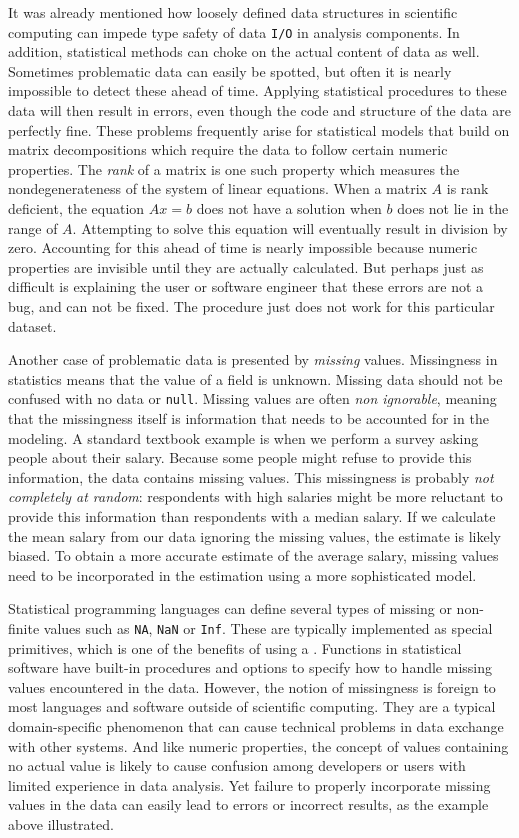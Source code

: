 It was already mentioned how loosely defined data structures in scientific computing can impede type safety of data \texttt{I/O} in analysis components. In addition, statistical methods can choke on the actual content of data as well. Sometimes problematic data can easily be spotted, but often it is nearly impossible to detect these ahead of time. Applying statistical procedures to these data will then result in errors, even though the code and structure of the data are perfectly fine. These problems frequently arise for statistical models that build on matrix decompositions which require the data to follow certain numeric properties. The \emph{rank} of a matrix is one such property which measures the nondegenerateness of the system of linear equations. When a matrix $A$ is rank deficient, the equation $Ax=b$ does not have a solution when $b$ does not lie in the range of $A$. Attempting to solve this equation will eventually result in division by zero. Accounting for this ahead of time is nearly impossible because numeric properties are invisible until they are actually calculated. But perhaps just as difficult is explaining the user or software engineer that these errors are not a bug, and can not be fixed. The procedure just does not work for this particular dataset.

Another case of problematic data is presented by \emph{missing} values. Missingness in statistics means that the value of a field is unknown. Missing data should not be confused with no data or \texttt{null}. Missing values are often \emph{non ignorable}, meaning that the missingness itself is information that needs to be accounted for in the modeling. A standard textbook example is when we perform a survey asking people about their salary. Because some people might refuse to provide this information, the data contains missing values. This missingness is probably \emph{not completely at random}: respondents with high salaries might be more reluctant to provide this information than respondents with a median salary. If we calculate the mean salary from our data ignoring the missing values, the estimate is likely biased. To obtain a more accurate estimate of the average salary, missing values need to be incorporated in the estimation using a more sophisticated model. 

Statistical programming languages can define several types of missing or non-finite values such as \texttt{NA}, \texttt{NaN} or \texttt{Inf}. These are typically implemented as special primitives, which is one of the benefits of using a \DSL. Functions in statistical software have built-in procedures and options to specify how to handle missing values encountered in the data. However, the notion of missingness is foreign to most languages and software outside of scientific computing. They are a typical domain-specific phenomenon that can cause technical problems in data exchange with other systems. And like numeric properties, the concept of values containing no actual value is likely to cause confusion among developers or users with limited experience in data analysis. Yet failure to properly incorporate missing values in the data can easily lead to errors or incorrect results, as the example above illustrated.

